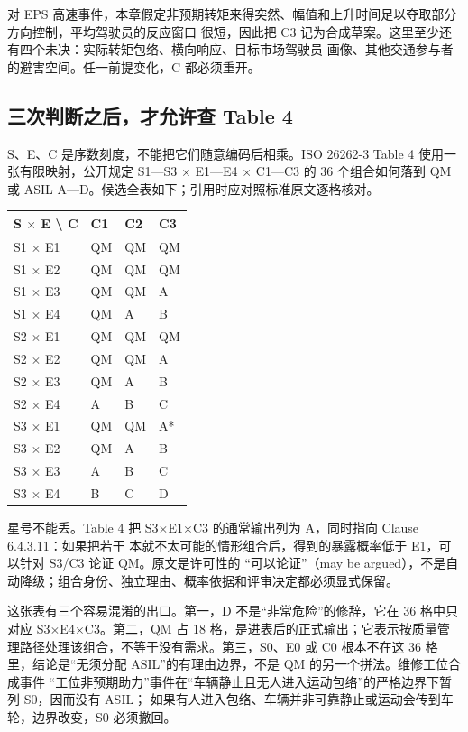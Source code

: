对 EPS 高速事件，本章假定非预期转矩来得突然、幅值和上升时间足以夺取部分方向控制，平均驾驶员的反应窗口
很短，因此把 C3 记为合成草案。这里至少还有四个未决：实际转矩包络、横向响应、目标市场驾驶员
画像、其他交通参与者的避害空间。任一前提变化，C 都必须重开。

\subsection{三次判断之后，才允许查 Table 4}

S、E、C 是序数刻度，不能把它们随意编码后相乘。ISO 26262-3 Table 4 使用一张有限映射，公开规定
S1—S3 \(\times\) E1—E4 \(\times\) C1—C3 的 36 个组合如何落到 QM 或 ASIL A—D。候选全表如下；引用时应对照标准原文逐格核对。

\begingroup\small
\setlength{\tabcolsep}{4pt}
\begin{xltabular}{\linewidth}{@{}XXXX@{}}
\toprule
S \(\times\) E \textbackslash{} C & C1 & C2 & C3 \\
\midrule
\endhead
S1 \(\times\) E1 & QM & QM & QM \\
S1 \(\times\) E2 & QM & QM & QM \\
S1 \(\times\) E3 & QM & QM & A \\
S1 \(\times\) E4 & QM & A & B \\
S2 \(\times\) E1 & QM & QM & QM \\
S2 \(\times\) E2 & QM & QM & A \\
S2 \(\times\) E3 & QM & A & B \\
S2 \(\times\) E4 & A & B & C \\
S3 \(\times\) E1 & QM & QM & A* \\
S3 \(\times\) E2 & QM & A & B \\
S3 \(\times\) E3 & A & B & C \\
S3 \(\times\) E4 & B & C & D \\
\bottomrule
\end{xltabular}
\endgroup

星号不能丢。Table 4 把 S3\(\times\)E1\(\times\)C3 的通常输出列为 A，同时指向 Clause 6.4.3.11：如果把若干
本就不太可能的情形组合后，得到的暴露概率低于 E1，可以针对 S3/C3 论证 QM。原文是许可性的
“可以论证”（may be argued），不是自动降级；组合身份、独立理由、概率依据和评审决定都必须显式保留。

这张表有三个容易混淆的出口。第一，D 不是“非常危险”的修辞，它在 36 格中只对应
S3\(\times\)E4\(\times\)C3。第二，QM 占 18 格，是进表后的正式输出；它表示按质量管理路径处理该组合，不等于没有需求。第三，S0、E0
或 C0 根本不在这 36 格里，结论是“无须分配 ASIL”的有理由边界，不是 QM 的另一个拼法。维修工位合成事件
“工位非预期助力”事件在“车辆静止且无人进入运动包络”的严格边界下暂列 S0，因而没有 ASIL；
如果有人进入包络、车辆并非可靠静止或运动会传到车轮，边界改变，S0 必须撤回。

